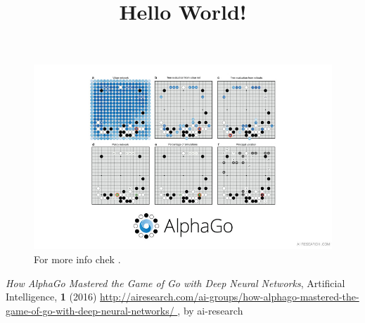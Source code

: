 \documentclass{article}
\begin{document}
  \title{Hello World!}
  \date{}
\maketitle


\begin{figure}[h!]
  \includegraphics[width=\linewidth]{alpha_go.jpg}
 	For more info chek \cite{Alpha_GO}. 
  \label{fig:boat1}
\end{figure}

\newpage
{\small
\begin{thebibliography}{9999}

\textit{How AlphaGo Mastered the Game of Go with Deep Neural Networks},
 Artificial Intelligence, \textbf{1} (2016) \url {http://airesearch.com/ai-groups/how-alphago-mastered-the-game-of-go-with-deep-neural-networks/ } , by ai-research
\end{thebibliography}
}
\end{document}
